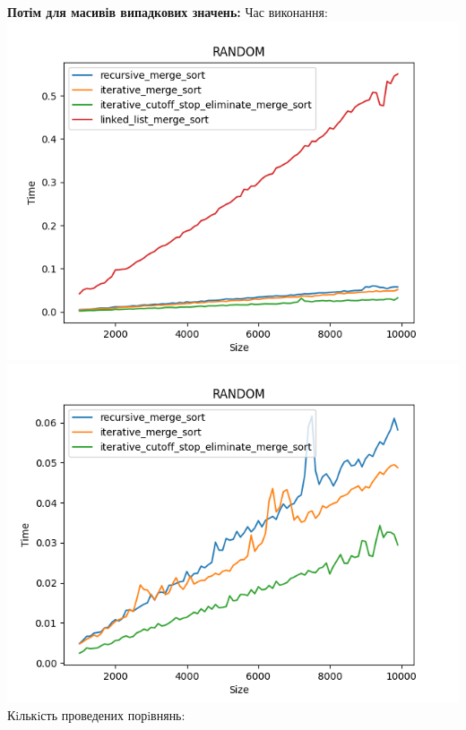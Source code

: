 \documentclass{article}
\begin{document}
        \newpage
        \textbf{Потім для масивів випадкових значень:} 
        \newline
        Час виконання:
        \newline
            \includegraphics[scale=0.5]{random_Time_4_sorts_90_numbers_50.png}
            \includegraphics[scale=0.5]{random_Time_3_sorts_90_numbers_50.png}
        \newline
        Кiлькiсть проведених порiвнянь:
        \newline
\end{document}
